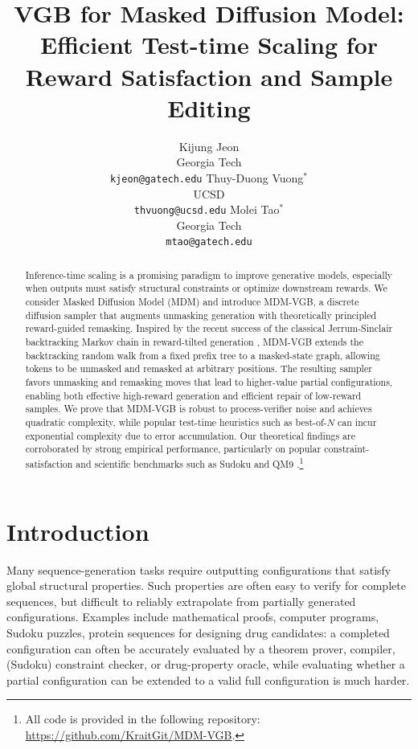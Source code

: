 \documentclass{article}
\title{VGB for Masked Diffusion Model: Efficient Test-time Scaling for Reward Satisfaction and Sample Editing}
\author{
Kijung Jeon\\
Georgia Tech\\
\texttt{kjeon@gatech.edu}
\And
Thuy-Duong Vuong$^{*}$\\
UCSD\\
\texttt{thvuong@ucsd.edu}
\And
Molei Tao$^{*}$\\
Georgia Tech\\
\texttt{mtao@gatech.edu}
}
\numberwithin{theorem}{section}
\numberwithin{proposition}{section}
\numberwithin{corollary}{section}
\numberwithin{lemma}{section}
\numberwithin{conjecture}{section}
\numberwithin{remark}{section}
\numberwithin{definition}{section}
\numberwithin{assumption}{section}
\numberwithin{example}{section}
\begin{document}
\maketitle
\begingroup
\renewcommand{\thefootnote}{\fnsymbol{footnote}}
\endgroup
\begin{abstract}
    Inference-time scaling is a promising paradigm to improve generative models, especially when outputs must satisfy structural constraints or optimize downstream rewards. We consider Masked Diffusion Model (MDM) and introduce MDM-VGB, a discrete diffusion sampler that augments unmasking generation with theoretically principled reward-guided remasking. Inspired by the recent success of the classical Jerrum-Sinclair backtracking Markov chain \cite{sinclair1989approximate} in reward-tilted generation \cite{rohatgi2025taming}, 
    MDM-VGB extends the backtracking random walk from a fixed prefix tree to a masked-state graph,  allowing tokens to be unmasked and remasked at arbitrary positions. 
    The resulting sampler favors unmasking and remasking moves that lead to higher-value partial configurations, enabling both effective high-reward generation and efficient repair of low-reward samples. We prove that MDM-VGB is robust to process-verifier noise and achieves quadratic complexity, while popular test-time heuristics such as best-of-$N$ can incur exponential complexity due to error accumulation. Our theoretical findings are corroborated by strong empirical performance, particularly on popular constraint-satisfaction and scientific benchmarks such as Sudoku and QM9 \cite{ramakrishnan2014quantum}.\footnote{All code is provided in the following repository: \url{https://github.com/KraitGit/MDM-VGB}.}
\end{abstract}


\section{Introduction}
\label{sec:introduction}

\vspace{-8pt}
Many sequence-generation tasks require outputting configurations that satisfy global structural properties. Such properties are often easy to verify for complete sequences, but difficult to reliably extrapolate from partially generated configurations. Examples include mathematical proofs, computer programs, Sudoku puzzles, protein sequences for designing drug candidates: a completed configuration can often be accurately evaluated by a theorem prover, compiler, (Sudoku) constraint checker, or drug-property oracle, while evaluating whether a partial configuration can be extended to a valid full configuration is much harder.
\end{document}
